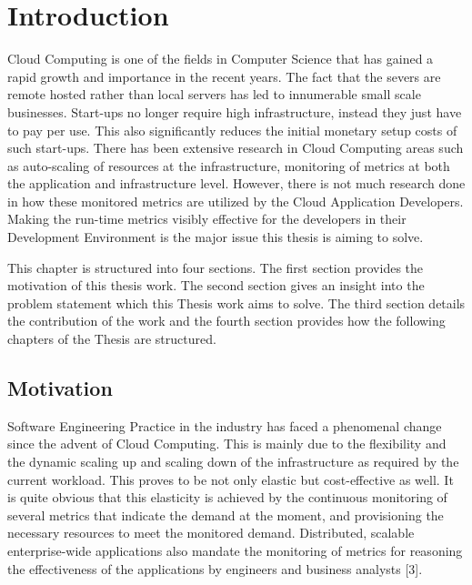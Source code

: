 \documentclass[article,type=msc,colorback,accentcolor=tud7b]{tudthesis}
\begin{document}
\listoffigures
\clearpage
\appendix
\cleardoublepage 

 \section{Introduction}
	
	Cloud Computing is one of the fields in Computer Science that has gained a rapid growth and importance in the recent years. The fact that the severs are remote hosted rather than local servers has led to innumerable small scale businesses. Start-ups no longer require high infrastructure, instead they just have to pay per use. This also significantly reduces the initial monetary setup costs of such start-ups. There has been extensive research in Cloud Computing areas such as auto-scaling of resources at the infrastructure, monitoring of metrics at both the application and infrastructure level. However, there is not much research done in how these monitored metrics are utilized by the Cloud Application Developers. Making the run-time metrics visibly effective for the developers in their Development Environment is the major issue this thesis is aiming to solve.
	\par This chapter is structured into four sections. The first section provides the motivation of this thesis work. The second section gives an insight into the problem statement which this Thesis work aims to solve. The third section details the contribution of the work and the fourth section provides how the following chapters of the Thesis are structured.
	
	\subsection{Motivation}
	
	Software Engineering Practice in the industry has faced a phenomenal change since the advent of Cloud Computing. This is mainly due to the flexibility and the dynamic scaling up and scaling down of the infrastructure as required by the current workload. This proves to be not only elastic but cost-effective as well. It is quite obvious that this elasticity is achieved by the continuous monitoring of several metrics that indicate the demand at the moment, and provisioning the necessary resources to meet the monitored demand. Distributed, scalable enterprise-wide applications also mandate the monitoring of metrics for reasoning the effectiveness of the applications by engineers and business analysts [3].
	
\end{document}
